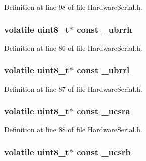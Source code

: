 Definition at line 98 of file Hardware\+Serial.\+h.

\hypertarget{class_hardware_serial_ac2dd0caa2b74a2992e1b9b0d63dec696}{}
\subsubsection[{\+\_\+ubrrh}]{\setlength{\rightskip}{0pt plus 5cm}volatile uint8\+\_\+t$\ast$ const \+\_\+ubrrh\hspace{0.3cm}{\ttfamily [protected]}}\label{class_hardware_serial_ac2dd0caa2b74a2992e1b9b0d63dec696}


Definition at line 86 of file Hardware\+Serial.\+h.

\hypertarget{class_hardware_serial_ad61fd40f665d597de97ec3995e251e93}{}
\subsubsection[{\+\_\+ubrrl}]{\setlength{\rightskip}{0pt plus 5cm}volatile uint8\+\_\+t$\ast$ const \+\_\+ubrrl\hspace{0.3cm}{\ttfamily [protected]}}\label{class_hardware_serial_ad61fd40f665d597de97ec3995e251e93}


Definition at line 87 of file Hardware\+Serial.\+h.

\hypertarget{class_hardware_serial_a691bd409418c1acc6fc583692b54764f}{}
\subsubsection[{\+\_\+ucsra}]{\setlength{\rightskip}{0pt plus 5cm}volatile uint8\+\_\+t$\ast$ const \+\_\+ucsra\hspace{0.3cm}{\ttfamily [protected]}}\label{class_hardware_serial_a691bd409418c1acc6fc583692b54764f}


Definition at line 88 of file Hardware\+Serial.\+h.

\hypertarget{class_hardware_serial_a06c3d929aa3eb0e48227139d1750a3a7}{}
\subsubsection[{\+\_\+ucsrb}]{\setlength{\rightskip}{0pt plus 5cm}volatile uint8\+\_\+t$\ast$ const \+\_\+ucsrb\hspace{0.3cm}{\ttfamily [protected]}}\label{class_hardware_serial_a06c3d929aa3eb0e48227139d1750a3a7}


